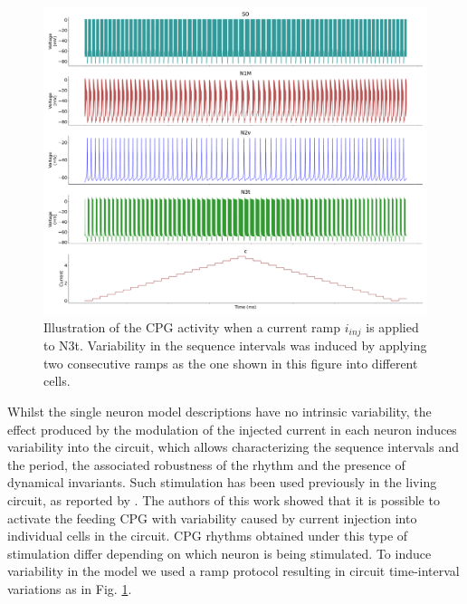 \begin{figure}[hbt!]
	\centering
	\includegraphics[width=\textwidth]{img/methods-paper-modelo/circuit_w_current.pdf}
	\caption{Illustration of the CPG activity when a current ramp \(i_{inj}\) is applied to N3t. Variability in the sequence intervals was induced by applying two consecutive ramps as the one shown in this figure into different cells.  }
	\label{fig:complete ramp example}
\end{figure}

Whilst the single neuron model descriptions have no intrinsic variability, the effect produced by the modulation of the injected current in each neuron induces variability into the circuit, which allows characterizing the sequence intervals and the period, the associated robustness of the rhythm and the presence of dynamical invariants. Such stimulation has been used previously in the living circuit, as reported by \textcite{elliott_temporal_1991}. The authors of this work showed that it is possible to activate the feeding CPG with variability caused by current injection into individual cells in the circuit. CPG rhythms obtained under this type of stimulation differ depending on which neuron is being stimulated. To induce variability in the model we used a ramp protocol resulting in circuit time-interval variations as in Fig. \ref{fig:complete ramp example}.



